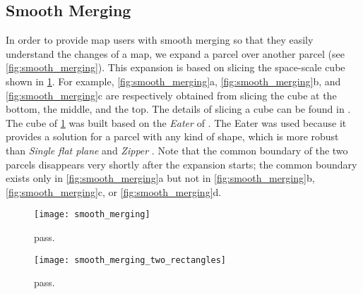 \documentclass[ijgi,article,submit,moreauthors,pdftex]{Definitions/mdpi}
\begin{document}
%
%



\subsection{Smooth Merging}

In order to provide map users with smooth merging
so that they easily understand the changes of a map,
we expand a parcel over another parcel
(see \fig\ref{fig:smooth_merging}).
This expansion is based on slicing the space-scale cube shown in
\fig\ref{fig:smooth_merging_two_rectangles}.
For example, \figs\ref{fig:smooth_merging}a,
\ref{fig:smooth_merging}b, and \ref{fig:smooth_merging}c
are respectively obtained from slicing the cube 
at the bottom, the middle, and the top.
The details of slicing a cube can be found in \citet{Meijers2020Web}.
The cube of \fig\ref{fig:smooth_merging_two_rectangles} was built 
based on the \emph{Eater} of \citet{Suba2014Merge}.
The Eater was used because it provides a solution 
for a parcel with any kind of shape, which is more robust than
\emph{Single flat plane} and \emph{Zipper} \citep{Suba2014Merge}.
Note that the common boundary of the two parcels disappears
very shortly after the expansion starts;
the common boundary exists only in \fig\ref{fig:smooth_merging}a but not in
\fig\ref{fig:smooth_merging}b,
\fig\ref{fig:smooth_merging}c, or
\fig\ref{fig:smooth_merging}d.


\begin{figure}[tb]	
\centering
\centering
\texttt{[image: smooth\_merging]}
\caption{pass.}
\label{fig:smooth_merging}
%
\vspace{6mm}
%
\centering
\texttt{[image: smooth\_merging\_two\_rectangles]}
\caption{pass.}
\label{fig:smooth_merging_two_rectangles}
\end{figure}
\end{document}

